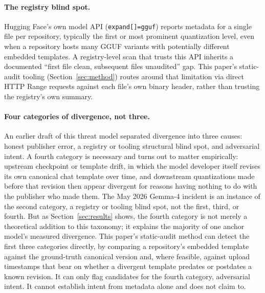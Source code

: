 \documentclass[letterpaper,twocolumn,10pt]{article}
\begin{document}
\paragraph{The registry blind spot.} Hugging Face's own model API (\texttt{expand[]=gguf}) reports metadata for a single file per repository, typically the first or most prominent quantization level, even when a repository hosts many GGUF variants with potentially different embedded templates. A registry-level scan that trusts this API inherits a documented ``first file clean, subsequent files unaudited'' gap. This paper's static-audit tooling (Section~\ref{sec:method}) routes around that limitation via direct HTTP Range requests against each file's own binary header, rather than trusting the registry's own summary.

\paragraph{Four categories of divergence, not three.} An earlier draft of this threat model separated divergence into three causes: honest publisher error, a registry or tooling structural blind spot, and adversarial intent. A fourth category is necessary and turns out to matter empirically: upstream checkpoint or template drift, in which the model developer itself revises its own canonical chat template over time, and downstream quantizations made before that revision then appear divergent for reasons having nothing to do with the publisher who made them. The May 2026 Gemma-4 incident is an instance of the second category, a registry or tooling blind spot, not the first, third, or fourth. But as Section~\ref{sec:results} shows, the fourth category is not merely a theoretical addition to this taxonomy; it explains the majority of one anchor model's measured divergence. This paper's static-audit method can detect the first three categories directly, by comparing a repository's embedded template against the ground-truth canonical version and, where feasible, against upload timestamps that bear on whether a divergent template predates or postdates a known revision. It can only flag candidates for the fourth category, adversarial intent. It cannot establish intent from metadata alone and does not claim to.
\end{document}
